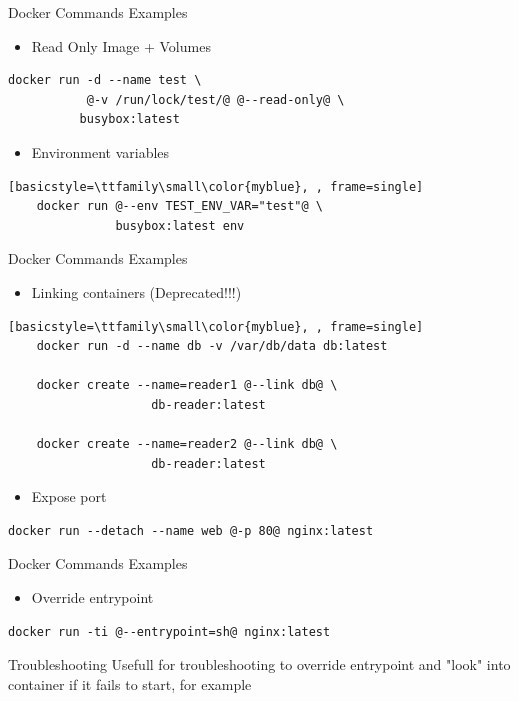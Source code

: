 \begin{frame}[fragile]{Docker Commands Examples}  
  \begin{itemize}
    \item Read Only Image + Volumes
  \end{itemize}
  \begin{lstlisting}[basicstyle=\ttfamily\small\color{myblue}, frame=single]
    docker run -d --name test \
           @-v /run/lock/test/@ @--read-only@ \
          busybox:latest
  \end{lstlisting}
  \begin{itemize}
    \item Environment variables
  \end{itemize}
  \begin{lstlisting}[basicstyle=\ttfamily\small\color{myblue}, , frame=single]
    docker run @--env TEST_ENV_VAR="test"@ \
               busybox:latest env
  \end{lstlisting}  
\end{frame}

\begin{frame}[fragile]{Docker Commands Examples}  
  \begin{itemize}
    \item Linking containers (Deprecated!!!)
  \end{itemize}
  \begin{lstlisting}[basicstyle=\ttfamily\small\color{myblue}, , frame=single]
    docker run -d --name db -v /var/db/data db:latest
    
    docker create --name=reader1 @--link db@ \
                    db-reader:latest

    docker create --name=reader2 @--link db@ \
                    db-reader:latest
  \end{lstlisting}  
  \begin{itemize}
    \item Expose port
  \end{itemize}
  \begin{lstlisting}[basicstyle=\ttfamily\small\color{myblue}, frame=single]
    docker run --detach --name web @-p 80@ nginx:latest
  \end{lstlisting}       
\end{frame}

\begin{frame}[fragile]{Docker Commands Examples} 
  \begin{itemize}
    \item Override entrypoint
  \end{itemize}
  \begin{lstlisting}[basicstyle=\ttfamily\small\color{myblue}, frame=single]
    docker run -ti @--entrypoint=sh@ nginx:latest
  \end{lstlisting}    
  \begin{exampleblock}{Troubleshooting}
  Usefull for troubleshooting to override entrypoint and "look" into container if it fails to start, for example
  \end{exampleblock}
\end{frame}

